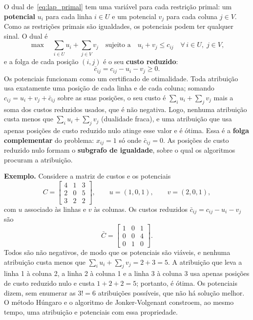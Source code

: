 O dual de~\eqref{eq:lap_primal} tem uma variável para cada restrição primal: um \textbf{potencial} $u_i$ para cada linha $i \in U$ e um potencial $v_j$ para cada coluna $j \in V$. Como as restrições primais são igualdades, os potenciais podem ter qualquer sinal. O dual é
\begin{equation}
    \max \quad \sum_{i \in U} u_i + \sum_{j \in V} v_j \quad \text{sujeito a} \quad u_i + v_j \le c_{ij} \quad \forall\, i \in U, \; j \in V,
    \label{eq:lap_dual}
\end{equation}
e a folga de cada posição $(i, j)$ é o seu \textbf{custo reduzido}:
\begin{equation}
    \bar{c}_{ij} = c_{ij} - u_i - v_j \ge 0.
    \label{eq:custo_reduzido}
\end{equation}
Os potenciais funcionam como um certificado de otimalidade. Toda atribuição usa exatamente uma posição de cada linha e de cada coluna; somando $c_{ij} = u_i + v_j + \bar{c}_{ij}$ sobre as suas posições, o seu custo é $\sum_i u_i + \sum_j v_j$ mais a soma dos custos reduzidos usados, que é não negativa. Logo, nenhuma atribuição custa menos que $\sum_i u_i + \sum_j v_j$ (dualidade fraca), e uma atribuição que usa apenas posições de custo reduzido nulo atinge esse valor e é ótima. Essa é a \textbf{folga complementar} do problema: $x_{ij} = 1$ só onde $\bar{c}_{ij} = 0$. As posições de custo reduzido nulo formam o \textbf{subgrafo de igualdade}, sobre o qual os algoritmos procuram a atribuição.

\textbf{Exemplo.} Considere a matriz de custos e os potenciais
\begin{equation}
    C = \begin{bmatrix} 4 & 1 & 3 \\ 2 & 0 & 5 \\ 3 & 2 & 2 \end{bmatrix}, \qquad u = (1, 0, 1), \qquad v = (2, 0, 1),
\end{equation}
com $u$ associado às linhas e $v$ às colunas. Os custos reduzidos $\bar{c}_{ij} = c_{ij} - u_i - v_j$ são
\begin{equation}
    \bar{C} = \begin{bmatrix} 1 & 0 & 1 \\ 0 & 0 & 4 \\ 0 & 1 & 0 \end{bmatrix}.
\end{equation}
Todos são não negativos, de modo que os potenciais são viáveis, e nenhuma atribuição custa menos que $\sum_i u_i + \sum_j v_j = 2 + 3 = 5$. A atribuição que leva a linha 1 à coluna 2, a linha 2 à coluna 1 e a linha 3 à coluna 3 usa apenas posições de custo reduzido nulo e custa $1 + 2 + 2 = 5$; portanto, é ótima. Os potenciais dizem, sem enumerar as $3! = 6$ atribuições possíveis, que não há solução melhor. O método Húngaro e o algoritmo de Jonker-Volgenant constroem, ao mesmo tempo, uma atribuição e potenciais com essa propriedade.

